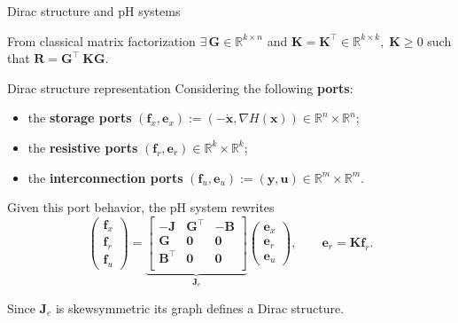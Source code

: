 \documentclass[aspectratio=169]{beamer}
\newcommand{\bbR}{\mathbb{R}}
\begin{document}
\begin{frame}{Dirac structure and pH systems}
	
	From classical matrix factorization $\exists \, \mathbf{G} \in \bbR^{k \times n}$ and $\mathbf{K} = \mathbf{K}^\top \in \bbR^{k \times k}, \; \mathbf{K} \ge 0$ such that $\mathbf{R} = \mathbf{G}^\top ~ \mathbf{K} \mathbf{G}$. \\
	
	\begin{block}{Dirac structure representation}
		Considering the following \textbf{ports}:
		\begin{itemize}
			\item
			the \textbf{storage ports} $(\mathbf{f}_{{x}}, \mathbf{e}_{{x}}) := \left(-\dot{\mathbf{x}}, \nabla H(\mathbf{x}) \right) \in \mathbb{R}^n \times \mathbb{R}^n$;
			\item
			the \textbf{resistive ports} $(\mathbf{f}_{r}, \mathbf{e}_{r}) \in \mathbb{R}^k \times \mathbb{R}^k$;
			\item
			the \textbf{interconnection ports} $(\mathbf{f}_{{u}}, \mathbf{e}_{{u}}) := (\mathbf{y}, \mathbf{u} ) \in \mathbb{R}^m \times \mathbb{R}^m$.
		\end{itemize}
		Given this port behavior, the pH system rewrites
		\begin{equation*}
			\begin{pmatrix}
				\mathbf{f}_{x} \\
				\mathbf{f}_{r} \\
				\mathbf{f}_{u}
			\end{pmatrix}
			=
			\underbrace{\begin{bmatrix}
					-\mathbf{J}	& \mathbf{G}^\top	& -\mathbf{B} \\
					\mathbf{G} 	& \mathbf{0}		& \mathbf{0} \\
					\mathbf{B}^\top	& \mathbf{0}	& \mathbf{0} \\
			\end{bmatrix}}_{\mathbf{J}_e}
			\begin{pmatrix}
				\mathbf{e}_{x}\\
				\mathbf{e}_{r}\\
				\mathbf{e}_{u}
			\end{pmatrix}, \qquad \mathbf{e}_{r} = \mathbf{K} \mathbf{f}_{r}.
		\end{equation*}
	
	Since $\mathbf{J}_e$ is skewsymmetric its graph defines a Dirac structure.
	\end{block}
	
\end{frame}
\end{document}
